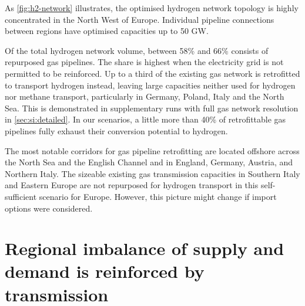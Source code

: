 
As \cref{fig:h2-network} illustrates, the optimised hydrogen network topology is
highly concentrated in the North West of Europe. Individual pipeline connections
between regions have optimised capacities up to 50 GW. %

Of the total hydrogen network volume, between 58\% and 66\% consists of
repurposed gas pipelines. The share is highest when the electricity grid is not
permitted to be reinforced. Up to a third of the existing gas network is
retrofitted to transport hydrogen instead, leaving large capacities neither used
for hydrogen nor methane transport, particularly in Germany, Poland, Italy and
the North Sea. This is demonstrated in supplementary runs with full gas network
resolution in \cref{sec:si:detailed}. In our scenarios, a little more than 40\%
of retrofittable gas pipelines fully exhaust their conversion potential to
hydrogen.

The most notable corridors for gas pipeline retrofitting are located offshore
across the North Sea and the English Channel and in England, Germany, Austria,
and Northern Italy. The sizeable existing gas transmission capacities in
Southern Italy and Eastern Europe are not repurposed for hydrogen transport in
this self-sufficient scenario for Europe. However, this picture might change if
import options were considered.



\section*{Regional imbalance of supply and demand is reinforced by transmission}
\label{sec:imbalance}


